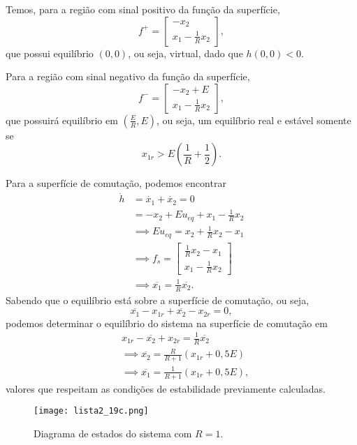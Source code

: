 \documentclass[a4paper]{report}
\begin{document}

Temos, para a região com sinal positivo da função da superfície, \[
f^{+} = \begin{bmatrix} 
    -x_2 \\
    x_1 - \frac{1}{R}x_2
\end{bmatrix} 
,\] que possui equilíbrio $(0,0)$, ou seja, virtual, dado que $h(0,0)<0$.

Para a região com sinal negativo da função da superfície, \[
f^{-} = \begin{bmatrix} 
    -x_2 + E \\
    x_1 - \frac{1}{R}x_2
\end{bmatrix} 
,\] que possuirá equilíbrio em $(\frac{E}{R},E)$, ou seja, um equilíbrio real e estável somente se \[
x_{1r} > E\left( \frac{1}{R}+\frac{1}{2} \right) 
.\]

Para a superfície de comutação, podemos encontrar
\begin{align*}
    \dot{h} &= \dot{x_1} + \dot{x_2}  = 0 \\
	    &= -x_2 + Eu_{eq} + x_1 - \frac{1}{R}x_2 \\
    &\implies E u_{eq} = x_2 +\frac{1}{R}x_2 - x_1  \\
    &\implies f_s = \begin{bmatrix} 
	\frac{1}{R}x_2 - x_1  \\
	x_1 - \frac{1}{R}x_2
    \end{bmatrix}  \\
    &\implies \overline{x_1} = \frac{1}{R}\overline{x_2}
.\end{align*}
Sabendo que o equilíbrio está sobre a superfície de comutação, ou seja, \[
\overline{x_1}-x_{1r} + \overline{x_2} - x_{2r} = 0
,\] podemos determinar o equilíbrio do sistema na superfície de comutação em
\begin{align*}
    &x_{1r} - \overline{x_2} + x_{2r} = \frac{1}{R}\overline{x_2} \\
    &\implies \overline{x_2} = \frac{R}{R+1}\left( x_{1r} + 0,5 E \right) \\
    &\implies \overline{x_1} = \frac{1}{R+1}\left( x_{1r} + 0,5 E \right) 
,\end{align*}
valores que respeitam as condições de estabilidade previamente calculadas.


\begin{figure}[H]
    \centering
    \texttt{[image: lista2\_19c.png]}
    \caption{Diagrama de estados do sistema com $R=1$.}
    \label{fig:lista2_19c-png}
\end{figure}
\end{document}
